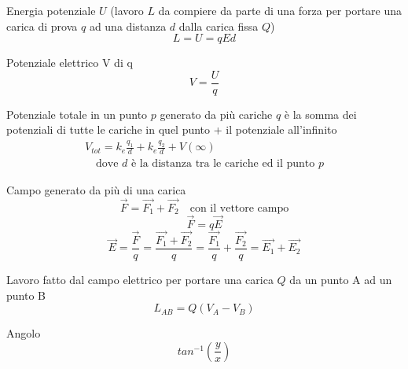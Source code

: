 \documentclass[14pt]{extarticle}
\begin{document}
Energia potenziale $U$ (lavoro $L$ da compiere da parte di una forza per portare una carica di prova $q$ ad una distanza $d$ dalla carica fissa $Q$)
\begin{equation*}
    L=U=qEd
\end{equation*}


Potenziale elettrico V di q
\begin{equation*}
    V=\frac{U}{q}
\end{equation*}

Potenziale totale in un punto $p$ generato da più cariche $q$ è la somma dei potenziali di tutte le cariche in quel punto + il potenziale all'infinito
\begin{align*}
    V_{tot} = k_e\frac{q_1}{d}+k_e\frac{q_2}{d}+V(\infty) \\
    \quad\text{dove $d$ è la distanza tra le cariche ed il punto $p$}
\end{align*}

Campo generato da più di una carica
\begin{equation*}
    \overrightarrow{F}=\overrightarrow{F_1}+\overrightarrow{F_2} \quad\text{con il vettore campo}
\end{equation*}
\begin{equation*}
    \overrightarrow{F}=q\overrightarrow{E}
\end{equation*}
\begin{equation*}
    \overrightarrow{E}=\frac{\overrightarrow{F}}{q}=\frac{\overrightarrow{F_1}+\overrightarrow{F_2}}{q}=\frac{\overrightarrow{F_1}}{q}+\frac{\overrightarrow{F_2}}{q}=\overrightarrow{E_1}+\overrightarrow{E_2}
\end{equation*}

Lavoro fatto dal campo elettrico per portare una carica $Q$ da un punto A ad un punto B
\begin{equation*}
    L_{AB}=Q(V_A-V_B)
\end{equation*}

Angolo
\begin{equation*}
    tan^{-1}(\frac{y}{x})
\end{equation*}
\end{document}
